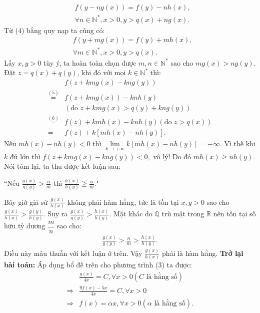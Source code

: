 \begin{multicols}{2}
	\begin{align*}
		&f(y - ng(x)) = f(y) - nh(x), \tag{$5$}\\
		&\forall n \in \mathbb{N^*},x > 0,y > q(x) + ng(x). 
	\end{align*}
	Từ ($4$) bằng quy nạp ta cũng có: 
	\begin{align*}
		&f(y + mg(x)) = f(y) + mh(x), \tag{$6$}\\
		&\forall m \in \mathbb{N^*},x > 0,y > q(x). 
	\end{align*}
	Lấy $x, y > 0$  tùy ý, ta hoàn toàn chọn được $m,n \in \mathbb{N^*}$  sao cho $mg(x) > ng(y)$. Đặt  $z = q(x) + q(y)$, khi đó với mọi $k \in \mathbb{N^*}$  thì: 
	\begin{align*}
		&f(z + kmg(x) - kng(y))\\
		\mathop  = \limits^{(5)} &f(z + kmg(x)) - knh(y)\\
		&(\text{do } z + kmg(x) > q(y) + kng(y))\\
		\mathop  = \limits^{(6)} &f(z) + kmh(x) - knh(y) (\text{do } z > q(x))\\
		= &f(z) + k[mh(x) - nh(y)].
	\end{align*}
	Nếu $mh(x) - nh(y) < 0$  thì $\mathop {\lim }\limits_{k \to  + \infty } k[mh(x) - nh(y)] =  - \infty$. Vì thế khi  $k$ đủ lớn thì $f(z + kmg(x) - kng(y)) < 0,$
	vô lý! Do đó  $mh(x) \ge nh(y)$.
	\vskip 0.1cm
	Nói tóm lại, ta thu được kết luận sau: 
	\vskip 0.1cm
	\centerline{``Nếu  $\frac{{g(x)}}{{g(y)}} > \frac{n}{m}$ thì  $\frac{{h(x)}}{{h(y)}} \ge \frac{n}{m}$."}
	\vskip 0.1cm
	Bây giờ giả sử $\frac{{g(x)}}{{h(x)}}$  không phải hàm hằng, tức là tồn tại $x,y > 0$  sao cho $\frac{{g(x)}}{{h(x)}} > \frac{{g(y)}}{{h(y)}}$. Suy ra  $\frac{{g(x)}}{{g(y)}} > \frac{{h(x)}}{{h(y)}}.$
	\vskip 0.1cm
	Mặt khác do $\mathbb{Q}$ trù mật trong  $\mathbb{R}$ nên tồn tại số hữu tỷ dương  $\dfrac{m}{n}$ sao cho: 
	\begin{align*}
		\frac{{g(x)}}{{g(y)}} > \frac{n}{m} > \frac{{h(x)}}{{h(y)}}.
	\end{align*}
	Điều này mâu thuẫn với kết luận ở trên. Vậy  $\frac{{g(x)}}{{h(x)}}$  phải là hàm hằng.
	\vskip 0.1cm
	\textbf{\color{hoccungpi}Trở lại bài toán:} Áp dụng bổ đề trên cho phương trình ($3$) ta được: 
	\begin{align*}
		&\frac{{g(x)}}{{4x}} = C,\forall x > 0 (C \text{ là hằng số})\\
		\Rightarrow &\frac{{9f(x) - 5x}}{{4x}} = C,\forall x > 0\\
		\Rightarrow &f(x) = \alpha x,\forall x > 0 (\alpha \text{ là hằng số}).

\end{align*}
\end{multicols}
